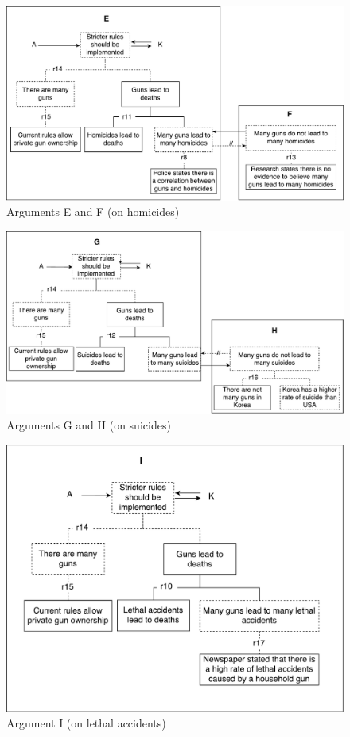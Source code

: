 \documentclass[]{article}
\begin{document}
\begin{figure}
\includegraphics[scale=0.5]{images/EF.pdf}
\caption{Arguments E and F (on homicides)}
\end{figure}
\begin{figure}
\includegraphics[scale=0.5]{images/GH.pdf}
\caption{Arguments G and H (on suicides)}
\end{figure}
\begin{figure}
\begin{center}
\includegraphics[scale=0.5]{images/I.pdf}
\end{center}
\caption{Argument I (on lethal accidents)}
\end{figure}
\end{document}
